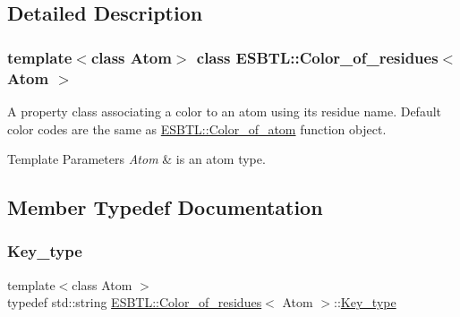 \subsection{Detailed Description}
\subsubsection*{template$<$class Atom$>$\newline
class E\+S\+B\+T\+L\+::\+Color\+\_\+of\+\_\+residues$<$ Atom $>$}

A property class associating a color to an atom using its residue name. Default color codes are the same as \hyperlink{structESBTL_1_1Color__of__atom}{E\+S\+B\+T\+L\+::\+Color\+\_\+of\+\_\+atom} function object. 
\begin{DoxyTemplParams}{Template Parameters}
{\em Atom} & is an atom type. \\
\hline
\end{DoxyTemplParams}


\subsection{Member Typedef Documentation}
\mbox{\label{classESBTL_1_1Color__of__residues_a38d3b296b236f785e36b7aba5a370f53}} 
\subsubsection{\texorpdfstring{Key\+\_\+type}{Key\_type}}
{\footnotesize\ttfamily template$<$class Atom $>$ \\
typedef std\+::string \hyperlink{classESBTL_1_1Color__of__residues}{E\+S\+B\+T\+L\+::\+Color\+\_\+of\+\_\+residues}$<$ Atom $>$\+::\hyperlink{classESBTL_1_1Color__of__residues_a38d3b296b236f785e36b7aba5a370f53}{Key\+\_\+type}}

\mbox{\label{classESBTL_1_1Color__of__residues_a330e9e55bf0f4610807939a480d0024e}} 
